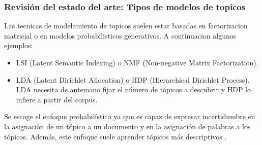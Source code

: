 \documentclass[
	spanish, %
	aspectratio=43, %
	hyperref={pdfencoding=auto,psdextra},
	xcolor={dvipsnames,table,usenames}
]{beamer}
\begin{document}
\begin{frame}

\frametitle{Revisión del estado del arte: Tipos de modelos de topicos}
Las tecnicas de modelamiento de topicos suelen estar basadas en factorizacion matricial o en modelos probabilisticos generativos. A continuacion algunos ejemplos:

\begin{itemize}
  \item LSI (Latent Semantic Indexing) \cite{dumais2004latent} o NMF (Non-negative Matrix Factorization)\cite{xu2003document}. 
  \item LDA (Latent Dirichlet Allocation)\cite{blei2003latent} o HDP (Hierarchical Dirichlet Process)\cite{teh2005sharing}. LDA necesita de antemano fijar el número de tópicos a descubrir y HDP lo infiere a partir del corpus.
\end{itemize} 

Se escoge el enfoque probabilístico ya que es capaz de expresar incertidumbre en la asignación de un tópico a un documento y en la asignación de palabras a los tópicos. Además, este enfoque suele aprender tópicos más descriptivos \cite{stevens2012exploring}.\\


\end{frame}
\end{document}
